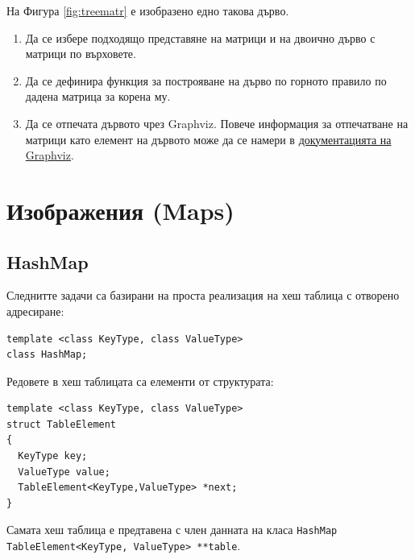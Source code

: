 \documentclass[12pt,a4paper]{article}
\newcommand{\code}[1]{\texttt{#1}}
\begin{document}
\begin{enumerate}[resume]
	На Фигура \ref{fig:treematr} е изобразено едно такова дърво.

	\begin{enumerate}[label=\alph*)]
		\item Да се избере подходящо представяне на матрици и на двоично дърво с матрици по върховете.
		\item Да се дефинира функция за построяване на дърво по горното правило по дадена матрица за корена му.
		\item Да се отпечата дървото чрез Graphviz. Повече информация за отпечатване на матрици като елемент на дървото може да се намери в \href{https://graphviz.gitlab.io/_pages/doc/info/shapes.html}{документацията на Graphviz}.
	\end{enumerate}


\end{enumerate}

\pagebreak

\section {Изображения (Maps)}
\subsection {HashMap}

\begin{mdframed}[hidealllines=true,backgroundcolor=gray!20]
Следнитте задачи са базирани на проста реализация на хеш таблица с отворено адресиране:
\begin{verbatim}
template <class KeyType, class ValueType>
class HashMap;
\end{verbatim}
Редовете в хеш таблицата са елементи от структурата:
\begin{verbatim}
template <class KeyType, class ValueType>
struct TableElement
{
  KeyType key;
  ValueType value;
  TableElement<KeyType,ValueType> *next;
}
\end{verbatim}
Самата хеш таблица е предтавена с член данната на класа \code{HashMap} \code{TableElement<KeyType, ValueType> **table}.
\end{mdframed}
\end{document}
